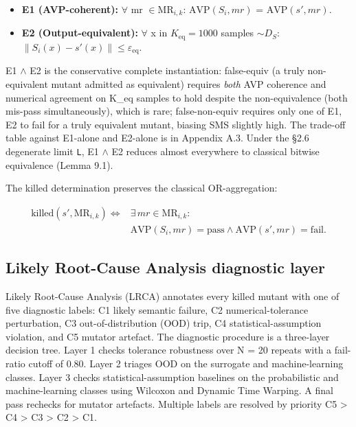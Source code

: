 \documentclass[acmsmall,screen,review]{acmart}
\providecommand{\tightlist}{\setlength{\itemsep}{0pt}\setlength{\parskip}{0pt}}
\begin{document}
\begin{itemize}
\tightlist
\item
  \textbf{E1 (AVP-coherent):} $\forall$ mr $\in \mathrm{MR}_{i,k}$: $\mathrm{AVP}(S_i, mr)$ =
  $\mathrm{AVP}(s', mr)$.
\item
  \textbf{E2 (Output-equivalent):} $\forall$ x in $K_{\mathrm{eq}}=1000$ samples
  $\sim D_S$: $\|S_i(x) - s'(x)\| \leq \varepsilon_{\mathrm{eq}}$.
\end{itemize}

E1 $\wedge$ E2 is the conservative complete instantiation: false-equiv (a
truly non-equivalent mutant admitted as equivalent) requires \emph{both}
AVP coherence and numerical agreement on K\_eq samples to hold despite the
non-equivalence (both mis-pass simultaneously), which is rare;
false-non-equiv requires only one of E1, E2 to fail for a truly equivalent
mutant, biasing SMS slightly high. The trade-off table against
E1-alone and E2-alone is in Appendix A.3. Under the §2.6 degenerate
limit \texttt{L}, E1 $\wedge$ E2 reduces almost everywhere to classical bitwise
equivalence (Lemma 9.1).

The killed determination preserves the classical OR-aggregation:

\[
\begin{aligned}
\mathrm{killed}(s', \mathrm{MR}_{i,k}) \iff{} & \exists\,mr \in \mathrm{MR}_{i,k}: \\
& \mathrm{AVP}(S_i, mr) = \text{pass} \wedge
  \mathrm{AVP}(s', mr) = \text{fail}.
\end{aligned}
\]

\subsection{Likely Root-Cause Analysis diagnostic layer}\label{lrca-engineering-attribution-layer-descriptive-not-in-sms}

Likely Root-Cause Analysis (LRCA) annotates every killed mutant with one
of five diagnostic labels: C1 likely semantic failure, C2
numerical-tolerance perturbation, C3 out-of-distribution (OOD) trip, C4
statistical-assumption violation, and C5 mutator artefact. The diagnostic
procedure is a three-layer decision tree.
Layer 1 checks tolerance robustness over N = 20 repeats with a
fail-ratio cutoff of 0.80. Layer 2 triages OOD on the surrogate and
machine-learning classes. Layer 3 checks statistical-assumption
baselines on the probabilistic and machine-learning classes using
Wilcoxon and Dynamic Time Warping. A final pass rechecks for mutator
artefacts. Multiple labels are resolved by priority C5 \textgreater{} C4
\textgreater{} C3 \textgreater{} C2 \textgreater{} C1.
\end{document}
